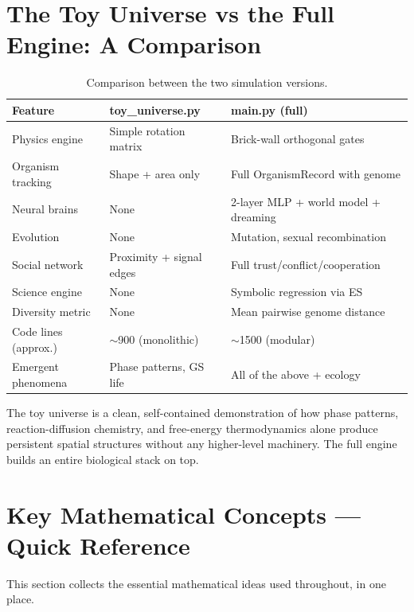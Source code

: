 \documentclass[12pt,a4paper]{article}
\begin{document}
\section{The Toy Universe vs the Full Engine: A Comparison}

\begin{table}[h]
\centering
\renewcommand{\arraystretch}{1.3}
\begin{tabular}{lll}
\toprule
\textbf{Feature} & \textbf{toy\_universe.py} & \textbf{main.py (full)} \\
\midrule
Physics engine & Simple rotation matrix & Brick-wall orthogonal gates \\
Organism tracking & Shape + area only & Full OrganismRecord with genome \\
Neural brains & None & 2-layer MLP + world model + dreaming \\
Evolution & None & Mutation, sexual recombination \\
Social network & Proximity + signal edges & Full trust/conflict/cooperation \\
Science engine & None & Symbolic regression via ES \\
Diversity metric & None & Mean pairwise genome distance \\
\midrule
Code lines (approx.) & $\sim$900 (monolithic) & $\sim$1500 (modular) \\
Emergent phenomena & Phase patterns, GS life & All of the above + ecology \\
\bottomrule
\end{tabular}
\caption{Comparison between the two simulation versions.}
\end{table}

The toy universe is a clean, self-contained demonstration
of how phase patterns, reaction-diffusion chemistry, and
free-energy thermodynamics alone produce persistent
spatial structures without any higher-level machinery.
The full engine builds an entire biological stack on top.

\section{Key Mathematical Concepts — Quick Reference}

This section collects the essential mathematical ideas
used throughout, in one place.
\end{document}
